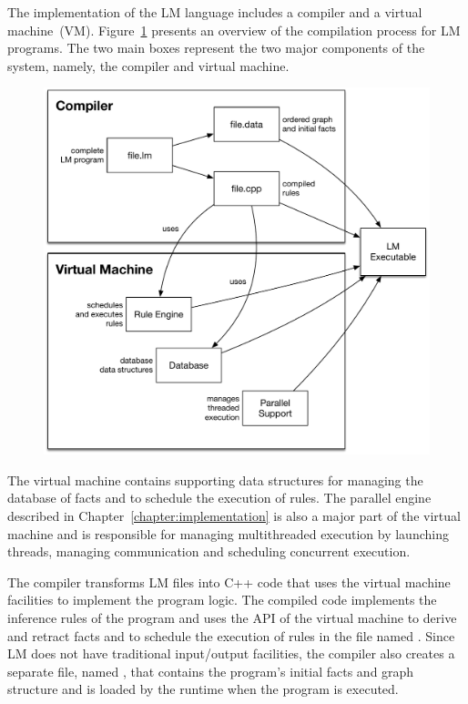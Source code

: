 The implementation of the LM language includes a compiler and a virtual
machine~(VM). Figure~\ref{fig:implementation:overview} presents an overview of
the compilation process for LM programs. The two main boxes represent the two
major components of the system, namely, the compiler and virtual machine.

\begin{figure}[ht]
  \centering
  \includegraphics[width=.75\linewidth]{figures/implementation/overview.pdf}


  \label{fig:implementation:overview}
\end{figure}

The virtual machine contains supporting data structures for managing the
database of facts and to schedule the execution of rules. The parallel engine
described in Chapter~\ref{chapter:implementation} is also a major part of the
virtual machine and is responsible for managing multithreaded execution by
launching threads, managing communication and scheduling concurrent execution.

The compiler transforms LM files into C++ code that uses the virtual machine
facilities to implement the program logic. The compiled code implements the
inference rules of the program and uses the API of the virtual machine to derive
and retract facts and to schedule the execution of rules in the file named
. Since LM does not have traditional input/output facilities, the
compiler also creates a separate file, named , that contains the
program's initial facts and graph structure and is loaded by the runtime when
the program is executed.

